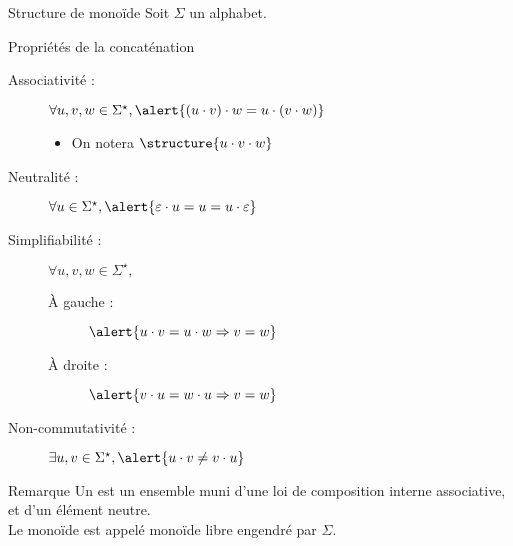 
\begingroup



\begin{frame}{Structure de monoïde}
  Soit $\Sigma$ un alphabet. 
  
  \begin{block}{Propriétés de la concaténation}
  \begin{description}
  \item[Associativité :] $\forall u, v, w \in \Sigma^\star, \alert{(u\cdot v)\cdot w = u\cdot (v\cdot w)}$
    \begin{itemize}
    \item On notera $\structure{u\cdot v\cdot w}$
    \end{itemize}
  \item[Neutralité :] $\forall u \in \Sigma^\star, \alert{\varepsilon \cdot u = u = u \cdot \varepsilon}$
  \item[Simplifiabilité :] $\forall u, v, w \in \Sigma^\star,$
    \begin{description}
    \item[À gauche :] $\alert{u \cdot v = u \cdot w \Rightarrow v=w}$
    \item[À droite :] $\alert{v \cdot u = w \cdot u \Rightarrow v=w}$
    \end{description}
  \item[Non-commutativité :] $ \exists u,v \in \Sigma^\star, \alert{u\cdot v \neq v\cdot u}$
  \end{description}
  \end{block}

  \begin{block}{Remarque}
    Un  est un ensemble muni d'une loi de composition interne associative, et d'un élément neutre. \\
    Le monoïde \structure{$\langle \Sigma^\star, \cdot , \varepsilon \rangle$} est appelé \alert{monoïde libre engendré par $\Sigma$}.
  \end{block}
\end{frame}


\endgroup
